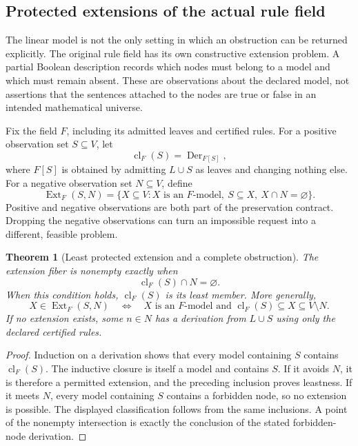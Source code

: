 \documentclass[11pt,oneside]{article}
\theoremstyle{komorebiplain}
\newtheorem{theorem}{Theorem}[section]
\theoremstyle{komorebidefinition}
\theoremstyle{komorebiremark}
\begin{document}
\subsection{Protected extensions of the actual rule field}
\label{sec:protected-rule-extension}

The linear model is not the only setting in which an obstruction can be returned explicitly. The original rule field has its own constructive extension problem. A partial Boolean description records which nodes must belong to a model and which must remain absent. These are observations about the declared model, not assertions that the sentences attached to the nodes are true or false in an intended mathematical universe.

Fix the field $F$, including its admitted leaves and certified rules. For a positive observation set $S\subseteq V$, let
\[
  \operatorname{cl}_F(S)=\operatorname{Der}_{F[S]},
\]
where $F[S]$ is obtained by admitting $L\cup S$ as leaves and changing nothing else. For a negative observation set $N\subseteq V$, define
\[
 \operatorname{Ext}_F(S,N)=
 \{X\subseteq V:X\text{ is an }F\text{-model},\ S\subseteq X,\ X\cap N=\varnothing\}.
\]
Positive and negative observations are both part of the preservation contract. Dropping the negative observations can turn an impossible request into a different, feasible problem.

\begin{theorem}[Least protected extension and a complete obstruction]
\label{res:new:extension}
The extension fiber is nonempty exactly when
\[
 \operatorname{cl}_F(S)\cap N=\varnothing.
\]
When this condition holds, $\operatorname{cl}_F(S)$ is its least member. More generally,
\[
 X\in\operatorname{Ext}_F(S,N)
 \quad\Longleftrightarrow\quad
 X\text{ is an }F\text{-model and }
 \operatorname{cl}_F(S)\subseteq X\subseteq V\setminus N.
\]
If no extension exists, some $n\in N$ has a derivation from $L\cup S$ using only the declared certified rules.
\end{theorem}
\begin{proof}
Induction on a derivation shows that every model containing $S$ contains $\operatorname{cl}_F(S)$. The inductive closure is itself a model and contains $S$. If it avoids $N$, it is therefore a permitted extension, and the preceding inclusion proves leastness. If it meets $N$, every model containing $S$ contains a forbidden node, so no extension is possible. The displayed classification follows from the same inclusions. A point of the nonempty intersection is exactly the conclusion of the stated forbidden-node derivation.
\end{proof}
\end{document}
